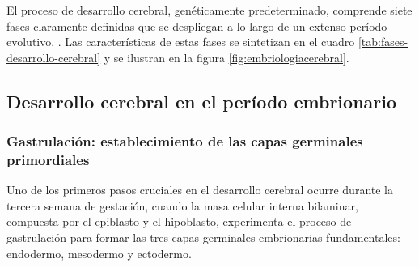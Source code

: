 \documentclass[11pt,letterpaper]{report}
\begin{document}
El proceso de desarrollo cerebral, genéticamente predeterminado, comprende
siete fases claramente definidas que se despliegan a lo largo de un extenso
período evolutivo. \cite{Kolb7}. Las características de estas fases se
sintetizan en el cuadro \ref{tab:fases-desarrollo-cerebral} y se ilustran en la
figura \ref{fig:embriologiacerebral}. 

\begin{table}[htbp]
\caption{Siete fases del desarrollo cerebral}
\label{tab:fases-desarrollo-cerebral}
\end{table}

\subsection{Desarrollo cerebral en el período embrionario}
\subsubsection{Gastrulación: establecimiento de las capas germinales primordiales}
Uno de los primeros pasos cruciales en el desarrollo cerebral ocurre durante la
tercera semana de gestación, cuando la masa celular interna bilaminar,
compuesta por el epiblasto y el hipoblasto, experimenta el proceso de
gastrulación para formar las tres capas germinales embrionarias fundamentales:
endodermo, mesodermo y ectodermo. \cite{Polin124}
\end{document}
